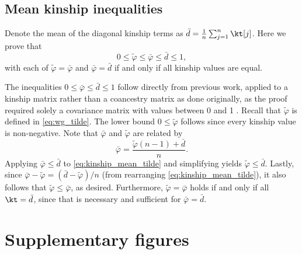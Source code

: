 \documentclass[11pt]{article}
\begin{document}
\begin{appendices}
  \section{Mean kinship inequalities}

  \label{sec:mean_kinship_ineqs}

  Denote the mean of the diagonal kinship terms as $\bar{d} = \frac{1}{n} \sum_{j=1}^n \kt[j]$.
  Here we prove that
  $$
  0 \le \tilde{\varphi} \le \bar{\varphi} \le \bar{d} \le 1,
  $$
  with each of $\tilde{\varphi} = \bar{\varphi}$ and $\bar{\varphi}= \bar{d}$ if and only if all kinship values are equal.

  The inequalities $0 \le \bar{\varphi} \le \bar{d} \le 1$ follow directly from previous work, applied to a kinship matrix rather than a coancestry matrix as done originally, as the proof required solely a covariance matrix with values between 0 and 1 \citep{ochoa_estimating_2021}.
  Recall that $\tilde{\varphi}$ is defined in \cref{eq:wg_tilde}.
  The lower bound $0 \le \tilde{\varphi}$ follows since every kinship value is non-negative.
  Note that $\bar{\varphi}$ and $\tilde{\varphi}$ are related by
  \begin{equation}
    \label{eq:kinship_mean_tilde}
    \bar{\varphi}
    =
    \frac{ \tilde{\varphi}(n-1) + \bar{d} }{n}.
  \end{equation}
  Applying $\bar{\varphi} \le \bar{d}$ to \cref{eq:kinship_mean_tilde} and simplifying yields $\tilde{\varphi} \le \bar{d}$.
  Lastly, since $\bar{\varphi} - \tilde{\varphi} = ( \bar{d}-\tilde{\varphi} ) / n$ (from rearranging \cref{eq:kinship_mean_tilde}), it also follows that $\tilde{\varphi} \le \bar{\varphi}$, as desired.
  Furthermore, $\tilde{\varphi} = \bar{\varphi}$ holds if and only if all $\kt = \bar{d}$, since that is necessary and sufficient for $\bar{\varphi} = \bar{d}$.

\end{appendices}


\clearpage

\section{Supplementary figures}
\end{document}
